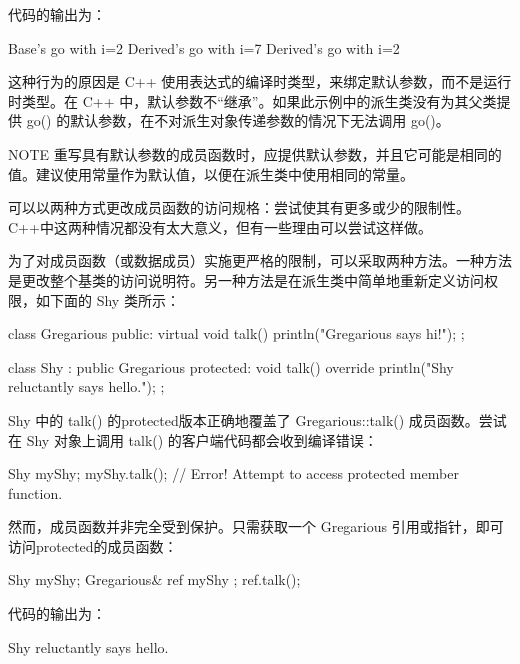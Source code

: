 代码的输出为：

\begin{shell}
Base's go with i=2
Derived's go with i=7
Derived's go with i=2
\end{shell}

这种行为的原因是 C++ 使用表达式的编译时类型，来绑定默认参数，而不是运行时类型。在 C++ 中，默认参数不“继承”。如果此示例中的派生类没有为其父类提供 go() 的默认参数，在不对派生对象传递参数的情况下无法调用 go()。

\begin{myNotic}{NOTE}
重写具有默认参数的成员函数时，应提供默认参数，并且它可能是相同的值。建议使用常量作为默认值，以便在派生类中使用相同的常量。
\end{myNotic}


可以以两种方式更改成员函数的访问规格：尝试使其有更多或少的限制性。C++中这两种情况都没有太大意义，但有一些理由可以尝试这样做。

为了对成员函数（或数据成员）实施更严格的限制，可以采取两种方法。一种方法是更改整个基类的访问说明符。另一种方法是在派生类中简单地重新定义访问权限，如下面的 Shy 类所示：

\begin{cpp}
class Gregarious
{
    public:
        virtual void talk() { println("Gregarious says hi!"); }
};

class Shy : public Gregarious
{
    protected:
        void talk() override { println("Shy reluctantly says hello."); }
};
\end{cpp}

Shy 中的 talk() 的protected版本正确地覆盖了 Gregarious::talk() 成员函数。尝试在 Shy 对象上调用 talk() 的客户端代码都会收到编译错误：

\begin{cpp}
Shy myShy;
myShy.talk(); // Error! Attempt to access protected member function.
\end{cpp}

然而，成员函数并非完全受到保护。只需获取一个 Gregarious 引用或指针，即可访问protected的成员函数：

\begin{cpp}
Shy myShy;
Gregarious& ref { myShy };
ref.talk();
\end{cpp}

代码的输出为：

\begin{shell}
Shy reluctantly says hello.
\end{shell}

